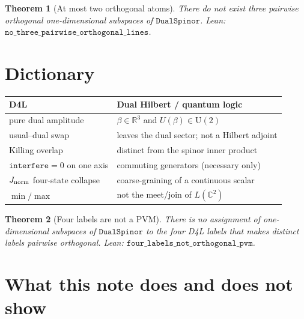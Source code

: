 \documentclass[dvipdfmx,11pt,a4paper]{article}
\newtheorem{theorem}{Theorem}[section]
\theoremstyle{definition}
\theoremstyle{remark}
\newcommand{\Jnorm}{J_{\rm norm}}
\begin{document}
\begin{theorem}[At most two orthogonal atoms]
\label{thm:two}
There do not exist three pairwise orthogonal one-dimensional subspaces
of $\texttt{DualSpinor}$. Lean:
$\texttt{no\_three\_pairwise\_orthogonal\_lines}$.
\end{theorem}

\section{Dictionary}
\label{sec:dict}

\begin{center}
\begin{tabular}{@{}ll@{}}
\toprule
D4L & Dual Hilbert / quantum logic \\
\midrule
pure dual amplitude & $\beta\in\mathbb{R}^3$ and $U(\beta)\in\mathrm{U}(2)$ \\
usual--dual swap & leaves the dual sector; not a Hilbert adjoint \\
Killing overlap & distinct from the spinor inner product \\
$\texttt{interfere}=0$ on one axis & commuting generators (necessary only) \\
$\Jnorm$ four-state collapse & coarse-graining of a continuous scalar \\
$\min/\max$ & not the meet/join of $L(\mathbb{C}^2)$ \\
\bottomrule
\end{tabular}
\end{center}

\begin{theorem}[Four labels are not a PVM]
\label{thm:pvm}
There is no assignment of one-dimensional subspaces of
$\texttt{DualSpinor}$ to the four D4L labels that makes distinct
labels pairwise orthogonal. Lean:
$\texttt{four\_labels\_not\_orthogonal\_pvm}$.
\end{theorem}

\section{What this note does and does not show}
\label{sec:claims}
\end{document}

